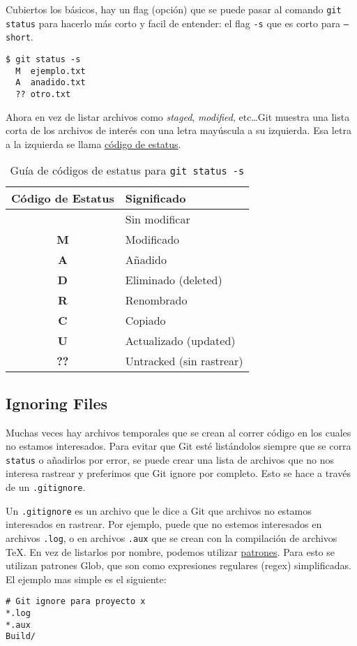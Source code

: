 \documentclass[spanish, 12pt, a4paper]{article}
\begin{document}
Cubiertos los básicos, hay un flag (opción) que se puede pasar al comando
\texttt{git status} para hacerlo más corto y facil de entender: el flag
\texttt{-s} que es corto para \texttt{--short}.
\begin{lstlisting}
$ git status -s
  M  ejemplo.txt
  A  anadido.txt
  ?? otro.txt
\end{lstlisting}

Ahora en vez de listar archivos como \textit{staged}, \textit{modified},
etc\dots Git muestra una lista corta de los archivos de interés con una letra
mayúscula a su izquierda.
Esa letra a la izquierda se llama \underline{código de estatus}.

\begin{table}[h]
  \centering
  \begin{tabular}{|c|l|}
	\hline
	Código de Estatus & Significado \\
	\hline \hline
	  & Sin modificar \\
	\hline
	\textbf{M} & Modificado \\
	\hline
	\textbf{A} & Añadido \\
	\hline
	\textbf{D} & Eliminado (deleted) \\
	\hline
	\textbf{R} & Renombrado \\
	\hline
	\textbf{C} & Copiado \\
	\hline
	\textbf{U} & Actualizado (updated)\\
	\hline
	\textbf{??} & Untracked (sin rastrear) \\
	\hline
  \end{tabular}
  \caption{Guía de códigos de estatus para \texttt{git status -s}}
\end{table}

\subsection{Ignoring Files}
Muchas veces hay archivos temporales que se crean al correr código en los cuales
no estamos interesados.
Para evitar que Git esté listándolos siempre que se corra \texttt{status} o
añadirlos por error, se puede crear una lista de archivos que no nos interesa
rastrear y preferimos que Git ignore por completo.
Esto se hace a través de un \texttt{.gitignore}.

Un \texttt{.gitignore} es un archivo que le dice a Git que archivos no estamos
interesados en rastrear.
Por ejemplo, puede que no estemos interesados en archivos \texttt{.log}, o en
archivos \texttt{.aux} que se crean con la compilación de archivos \TeX.
En vez de listarlos por nombre, podemos utilizar \underline{patrones}.
Para esto se utilizan patrones Glob, que son como expresiones regulares (regex)
simplificadas.
El ejemplo mas simple es el siguiente:
\begin{lstlisting}
# Git ignore para proyecto x
*.log
*.aux
Build/
\end{lstlisting}
\end{document}
